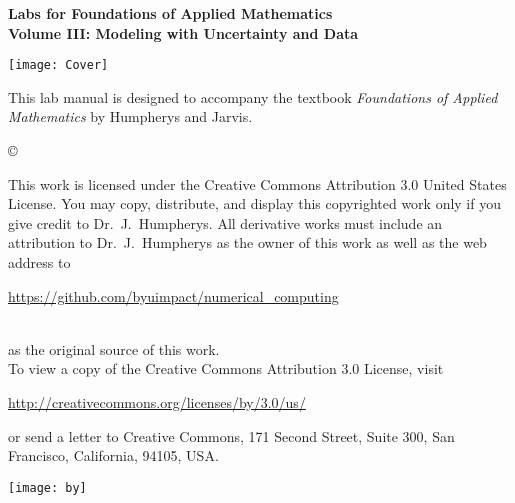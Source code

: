 \documentclass[nociteref]{SIAM-GH-book}
\begin{document}
\thispagestyle{empty}
\begin{center}
{\huge \bf Labs for Foundations of Applied Mathematics} \\
\vspace{5mm}
{\Large \bf Volume III: Modeling with
Uncertainty and Data}
\vspace{20mm}

\texttt{[image: Cover]}
\end{center}
\frontmatter




\begin{thepreface}
This lab manual is designed to accompany the textbook \emph{Foundations of Applied Mathematics} by Humpherys and Jarvis.

\vfill
\copyright{This work is licensed under the Creative Commons Attribution 3.0 United States
License.  You may copy, distribute, and display this copyrighted work only if you give
credit to Dr.~J.~Humpherys. All derivative works must include an attribution to Dr.~J.~Humpherys as the owner of this work as well as the web address to
\\\centerline{\url{https://github.com/byuimpact/numerical_computing}}\\ as the original source of
this
work.\\To view a copy of the Creative Commons Attribution 3.0 License,
visit\\\centerline{\url{http://creativecommons.org/licenses/by/3.0/us/}} or send a letter to
Creative Commons, 171 Second Street, Suite 300, San Francisco, California, 94105, USA.}

\vfill
\centering\texttt{[image: by]}
\vfill
\end{thepreface}

\setcounter{tocdepth}{1}
\tableofcontents

\mainmatter
\end{document}
